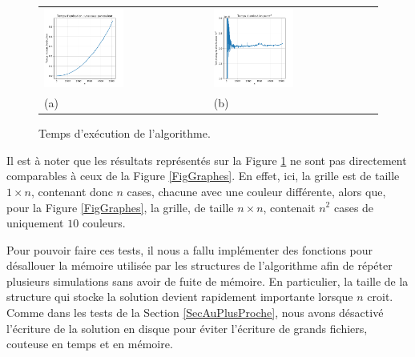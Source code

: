 \documentclass[a4paper,12pt]{article}
\numberwithin{equation}{section}
\begin{document}
\begin{figure}[ht]
\centering
\begin{tabular}{@{} >{\centering} m{} @{} >{\centering} m{} @{}}
\includegraphics[width=0.5\textwidth]{TempsGraphe.pdf} & \includegraphics[width=0.5\textwidth]{TempsGrapheN2.pdf} \tabularnewline
(a) & (b) \tabularnewline
\end{tabular}
\caption{Temps d'exécution de l'algorithme.}
\label{FigTempsGraphe}
\end{figure}

Il est à noter que les résultats représentés sur la Figure \ref{FigTempsGraphe} ne sont pas directement comparables à ceux de la Figure \ref{FigGraphes}. En effet, ici, la grille est de taille $1 \times n$, contenant donc $n$ cases, chacune avec une couleur différente, alors que, pour la Figure \ref{FigGraphes}, la grille, de taille $n \times n$, contenait $n^2$ cases de uniquement $10$ couleurs.

Pour pouvoir faire ces tests, il nous a fallu implémenter des fonctions pour désallouer la mémoire utilisée par les structures de l'algorithme afin de répéter plusieurs simulations sans avoir de fuite de mémoire. En particulier, la taille de la structure qui stocke la solution devient rapidement importante lorsque $n$ croit. Comme dans les tests de la Section \ref{SecAuPlusProche}, nous avons désactivé l'écriture de la solution en disque pour éviter l'écriture de grands fichiers, couteuse en temps et en mémoire.
\end{document}
